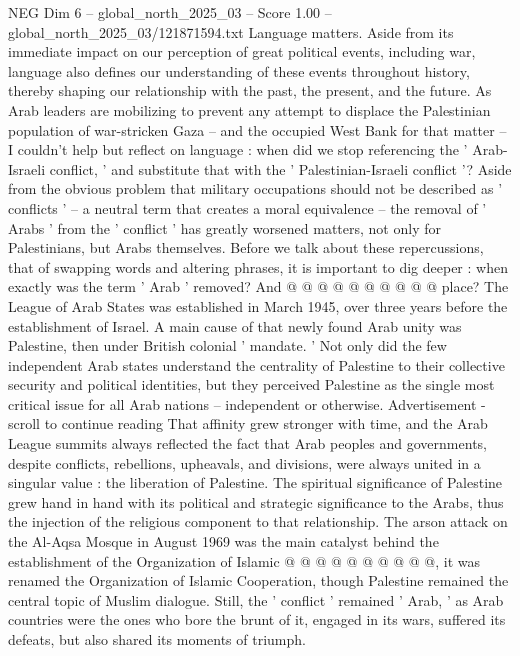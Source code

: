 \begin{textsample}{NEG Dim 6 – global\_north\_2025\_03 – Score 1.00 – global\_north\_2025\_03/121871594.txt}  \label{ex:f6_neg_174}
Language matters.
Aside from its immediate impact on our perception of great political events, including war, language also defines our understanding of these events throughout history, thereby shaping our relationship with the past, the present, and the future.
As Arab leaders are mobilizing to prevent any attempt to displace the Palestinian population of war-stricken Gaza -- and the occupied West Bank for that matter -- I couldn't help but reflect on language : when did we stop referencing the ' Arab-Israeli conflict, ' and substitute that with the ' Palestinian-Israeli conflict '?
Aside from the obvious problem that military occupations should not be described as ' conflicts ' -- a neutral term that creates a moral equivalence -- the removal of ' Arabs ' from the ' conflict ' has greatly worsened matters, not only for Palestinians, but Arabs themselves.
Before we talk about these repercussions, that of swapping words and altering phrases, it is important to dig deeper : when exactly was the term ' Arab ' removed?
And @ @ @ @ @ @ @ @ @ @ place?
The League of Arab States was established in March 1945, over three years before the establishment of Israel.
A main cause of that newly found Arab unity was Palestine, then under British colonial ' mandate. ' Not only did the few independent Arab states understand the centrality of Palestine to their collective security and political identities, but they perceived Palestine as the single most critical issue for all Arab nations -- independent or otherwise.
Advertisement - scroll to continue reading That affinity grew stronger with time, and the Arab League summits always reflected the fact that Arab peoples and governments, despite conflicts, rebellions, upheavals, and divisions, were always united in a singular value : the liberation of Palestine.
The spiritual significance of Palestine grew hand in hand with its political and strategic significance to the Arabs, thus the injection of the religious component to that relationship.
The arson attack on the Al-Aqsa Mosque in August 1969 was the main catalyst behind the establishment of the Organization of Islamic @ @ @ @ @ @ @ @ @ @, it was renamed the Organization of Islamic Cooperation, though Palestine remained the central topic of Muslim dialogue.
Still, the ' conflict ' remained ' Arab, ' as Arab countries were the ones who bore the brunt of it, engaged in its wars, suffered its defeats, but also shared its moments of triumph.

\end{textsample}
